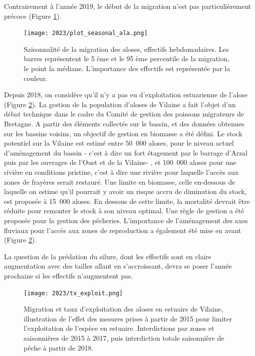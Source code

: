 \documentclass[11pt,twocolumn,titlepage,twoside]{article}\usepackage[]{graphicx}\usepackage[]{color}
\begin{document}
Contrairement à l'année 2019, le début de la migration n'est pas
particulièrement précoce (Figure \ref{plot_seasonal_ala}).




\begin{figure}[htpb]
\centering
\texttt{[image: 2023/plot\_seasonal\_ala.png]} 
\caption{Saisonnalité de la migration des aloses, effectifs hebdomadaires. Les
barres représentent le 5 ème et le 95 ème percentile de la migration, le point
la médiane. L'importance des effectifs est représentée par la couleur.}
\label{plot_seasonal_ala}
\end{figure}

Depuis 2018, on considère qu'il n'y a pas eu d'exploitation
estuarienne de l'alose (Figure \ref{tx_exploit}). La gestion de la population d'aloses
de Vilaine a fait l'objet d'un
débat technique dans le cadre du Comité de gestion des poissons migrateurs de
Bretagne.
A partir des éléments collectés sur le bassin, et des données obtenues sur les
bassins voisins, un objectif de gestion en biomasse a été défini. Le
stock potentiel sur la Vilaine est estimé entre 50~000 aloses, pour
le niveau actuel d'aménagement du bassin - c'est à dire un fort étagement
par le barrage d'Arzal puis par les ouvrages de l'Oust et de la Vilaine- , et
100~000 aloses pour une rivière en conditions pristine, c'est à dire une
rivière pour laquelle l'accès aux zones de frayères serait restauré. Une limite
en biomasse, celle en-dessous de laquelle on estime qu'il pourrait y avoir un
risque accru de diminution du stock, est proposée à 15~000 aloses. En dessous de
cette limite, la mortalité devrait être réduite pour remonter le stock à son
niveau optimal. Une règle de gestion a été proposée pour la gestion des
pêcheries. L'importance de l'aménagement des axes fluviaux pour l'accès aux
zones de reproduction a également été mise en avant (Figure \ref{tx_exploit}).

La question de la prédation du silure, dont les effectifs
sont en claire augmentation avec des tailles allant en s'accroissant, devra se poser l'année
prochaine si les effectifs n'augmentent pas.


\vfill
\begin{figure}[pbt]
\centering
\texttt{[image: 2023/tx\_exploit.png]} 
\caption{Migration et taux d'exploitation des aloses en estuaire de Vilaine,
illustration de l'effet des mesures prises à partir de 2015 pour limiter
l'exploitation de l'espèce en estuaire. Interdictions par zones et saisonnières
de 2015 à 2017, puis interdiction totale saisonnière de pêche à partir de 2018.}
\label{tx_exploit}
\end{figure}
\newpage %
\end{document}
